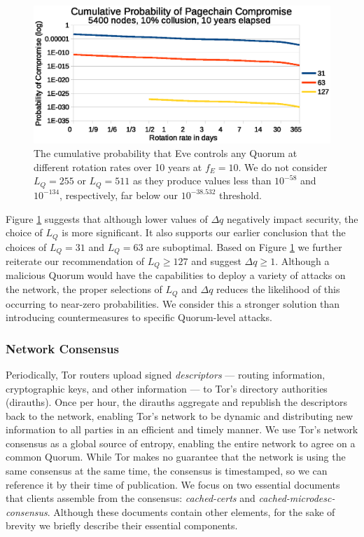 \documentclass{sig-alternate}
\begin{document}
\begin{figure}[h]
	\centering
	\includegraphics[width=\linewidth]{../analysis/CumulativeMaliciousQuorum_tight.eps}
	\caption{The cumulative probability that Eve controls any Quorum at different rotation rates over 10 years at $ f_{E} = 10 $. We do not consider $ L_{Q} = 255 $ or $ L_{Q} = 511 $ as they produce values less than $ 10^{-58} $ and $ 10^{-134} $, respectively, far below our $ 10^{-38.532} $ threshold.}
	\label{fig:cumulativeProbability}
\end{figure}

Figure \ref{fig:cumulativeProbability} suggests that although lower values of $ \Delta q $ negatively impact security, the choice of $ L_{Q} $ is more significant. It also supports our earlier conclusion that the choices of $ L_{Q} = 31 $ and $ L_{Q} = 63 $ are suboptimal. Based on Figure \ref{fig:cumulativeProbability} we further reiterate our recommendation of $ L_{Q} \geq 127 $ and suggest $ \Delta q \geq 1 $. Although a malicious Quorum would have the capabilities to deploy a variety of attacks on the network, the proper selections of $ L_{Q} $ and $ \Delta q $ reduces the likelihood of this occurring to near-zero probabilities. We consider this a stronger solution than introducing countermeasures to specific Quorum-level attacks.

\subsubsection{Network Consensus}


Periodically, Tor routers upload signed \emph{descriptors} --- routing information, cryptographic keys, and other information --- to Tor's directory authorities (dirauths). Once per hour, the dirauths aggregate and republish the descriptors back to the network, enabling Tor's network to be dynamic and distributing new information to all parties in an efficient and timely manner. We use Tor's network consensus as a global source of entropy, enabling the entire network to agree on a common Quorum. While Tor makes no guarantee that the network is using the same consensus at the same time, the consensus is timestamped, so we can reference it by their time of publication. We focus on two essential documents that clients assemble from the consensus: \emph{cached-certs} and \emph{cached-microdesc-consensus}. Although these documents contain other elements, for the sake of brevity we briefly describe their essential components.
\end{document}
